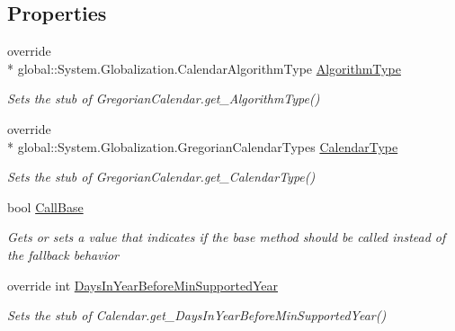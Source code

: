 \subsection*{Properties}
\begin{DoxyCompactItemize}
\item 
override \\*
global\-::\-System.\-Globalization.\-Calendar\-Algorithm\-Type \hyperlink{class_system_1_1_globalization_1_1_fakes_1_1_stub_gregorian_calendar_aab68cd380f90b5ed4c9dfc63ce8e206b}{Algorithm\-Type}
\begin{DoxyCompactList}\small\item\em Sets the stub of Gregorian\-Calendar.\-get\-\_\-\-Algorithm\-Type()\end{DoxyCompactList}\item 
override \\*
global\-::\-System.\-Globalization.\-Gregorian\-Calendar\-Types \hyperlink{class_system_1_1_globalization_1_1_fakes_1_1_stub_gregorian_calendar_a00abf89d4e56f268ec2ac2ca6807b134}{Calendar\-Type}
\begin{DoxyCompactList}\small\item\em Sets the stub of Gregorian\-Calendar.\-get\-\_\-\-Calendar\-Type()\end{DoxyCompactList}\item 
bool \hyperlink{class_system_1_1_globalization_1_1_fakes_1_1_stub_gregorian_calendar_a24d7bad6555ee13fa65d2438cefd21f9}{Call\-Base}
\begin{DoxyCompactList}\small\item\em Gets or sets a value that indicates if the base method should be called instead of the fallback behavior\end{DoxyCompactList}\item 
override int \hyperlink{class_system_1_1_globalization_1_1_fakes_1_1_stub_gregorian_calendar_af19f4278a59b2fd25c4fbab955acb812}{Days\-In\-Year\-Before\-Min\-Supported\-Year}
\begin{DoxyCompactList}\small\item\em Sets the stub of Calendar.\-get\-\_\-\-Days\-In\-Year\-Before\-Min\-Supported\-Year()\end{DoxyCompactList}\item 

\end{DoxyCompactItemize}
